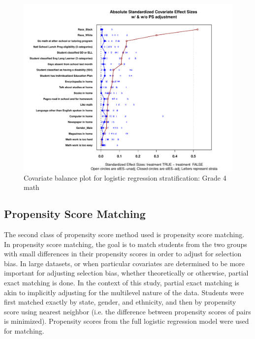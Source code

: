 \documentclass[letterpaper,12p,twoside]{article} %
\begin{document}


\begin{figure}[t]
\begin{center}
\includegraphics[width=\textwidth]{../Figures2009/g4math-lr-balance.pdf}
\caption{Covariate balance plot for logistic regression stratification: Grade 4 math}
\label{fig:g4math:balance}
\end{center}
\end{figure}


\clearpage




\subsection{Propensity Score Matching}

The second class of propensity score method used is propensity score matching. In propensity score matching, the goal is to match students from the two groups with small differences in their propensity scores in order to adjust for selection bias. In large datasets, or when particular covariates are determined to be more important for adjusting selection bias, whether theoretically or otherwise, partial exact matching is done. In the context of this study, partial exact matching is akin to implicitly adjusting for the multilevel nature of the data. Students were first matched exactly by state, gender, and ethnicity, and then by propensity score using nearest neighbor (i.e. the difference between propensity scores of pairs is minimized). Propensity scores from the full logistic regression model were used for matching.
\end{document}

